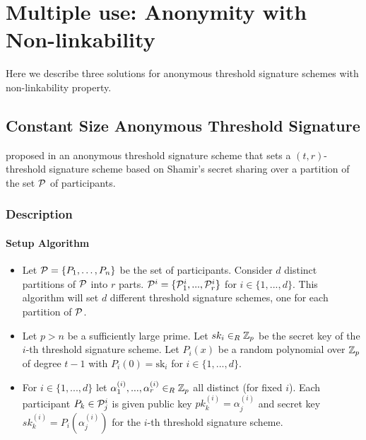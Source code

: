 \chapter{Multiple use: Anonymity with Non-linkability}
\label{chap:mult}
Here we describe three solutions for anonymous threshold signature schemes with non-linkability property.

\section{Constant Size Anonymous Threshold Signature}

\citeauthor*{DazaDSV09} proposed in \cite{DazaDSV09} an anonymous threshold signature scheme that sets a $(t,r)$-threshold signature scheme based on Shamir's secret sharing over a partition of the set ${\mathcal P}$ of participants.

\subsection{Description}
\label{sec:daza}
\subsubsection*{Setup Algorithm}
\begin{itemize}[align = left, leftmargin=*, label={--}]
\item Let ${\mathcal P} = \{P_1 , \dots , P_n \}$ be the set of participants. Consider $d$ distinct partitions of ${\mathcal P}$ into $r$ parts.
${\mathcal P}^i = \{{\mathcal P}^i_1, ... , {\mathcal P}^i_r\}$ for $i \in \{1, ... , d\}$. This algorithm will set $d$ different threshold signature schemes, one for each partition of ${\mathcal P}$.

\item Let $p > n$ be a sufficiently large prime. Let $sk_i \in_R {\mathbb Z}_p$ be the secret key of the $i$-th threshold signature scheme. Let $P_i(x)$ be a random polynomial over ${\mathbb Z}_p$ of degree $t-1$ with ${P_i(0) = \mbox{sk}_i}$ for $i \in \{1, ..., d\}$.

\item For $i \in \{1, ..., d\}$ let $\alpha^{(i)}_1, ... , \alpha^{(i)}_r \in_R {\mathbb Z}_p$ all distinct (for fixed $i$). Each participant $P_k \in {\mathcal P}^i_j$ is given public key $pk^{(i)}_k = \alpha^{(i)}_j$ and secret key $sk^{(i)}_k = P_i(\alpha^{(i)}_j)$ for the $i$-th threshold signature scheme. 
\end{itemize}

